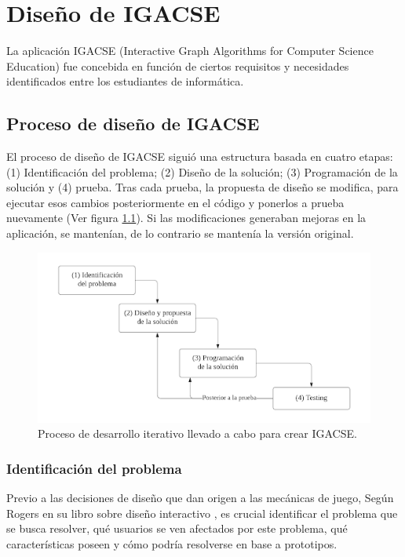 \chapter{Diseño de IGACSE}

La aplicación IGACSE (Interactive Graph Algorithms for Computer Science Education) fue concebida en función de ciertos requisitos y necesidades identificados entre los estudiantes de informática.

\section{Proceso de diseño de IGACSE}

El proceso de diseño de IGACSE siguió una estructura basada en cuatro etapas: (1) Identificación del problema; (2) Diseño de la solución; (3) Programación de la solución y (4) prueba. Tras cada prueba, la propuesta de diseño se modifica, para ejecutar esos cambios posteriormente en el código y ponerlos a prueba nuevamente (Ver figura \ref{ProcesoDeDiseno}). Si las modificaciones generaban mejoras en la aplicación, se mantenían, de lo contrario se mantenía la versión original.

\begin{figure}[h!]
	\centering
	\includegraphics[scale=.9]{imagenes/ProcesoDeDisenoDiagrama.png}
	\caption{Proceso de desarrollo iterativo llevado a cabo para crear IGACSE.}
	\label{ProcesoDeDiseno}
\end{figure}


\subsection{Identificación del problema}

Previo a las decisiones de diseño que dan origen a las mecánicas de juego, Según Rogers en su libro sobre diseño interactivo \cite{Rogers2002InteractionDesign}, es crucial identificar el problema que se busca resolver, qué usuarios se ven afectados por este problema, qué características poseen y cómo podría resolverse en base a prototipos.

